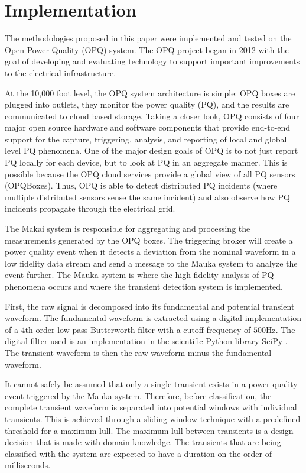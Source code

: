 \documentclass[10pt,conference,compsocconf]{IEEEtran}
\begin{document}
\section{Implementation}
\label{sec:Implementation}
The methodologies proposed in this paper were implemented and tested on the Open Power Quality (OPQ) system. The OPQ project began in 2012 with the goal of developing and evaluating technology to support important improvements to the electrical infrastructure. 

At the 10,000 foot level, the OPQ system architecture is simple: OPQ boxes are plugged into outlets, they monitor the power quality (PQ), and the results are communicated to cloud based storage. Taking a closer look, OPQ consists of four major open source hardware and software components that provide end-to-end support for the capture, triggering, analysis, and reporting of local and global level PQ phenomena. One of the major design goals of OPQ is to not just report PQ locally for each device, but to look at PQ in an aggregate manner. This is possible because the OPQ cloud services provide a global view of all PQ sensors (OPQBoxes). Thus, OPQ is able to detect distributed PQ incidents (where multiple distributed sensors sense the same incident) and also observe how PQ incidents propagate through the electrical grid.

The Makai system is responsible for aggregating and processing the measurements generated by the OPQ boxes. The triggering broker will create a power quality event when it detects a deviation from the nominal waveform in a low fidelity data stream and send a message to the Mauka system to analyze the event further. The Mauka system is where the high fidelity analysis of PQ phenomena occurs and where the transient detection system is implemented.

First, the raw signal is decomposed into its fundamental and potential transient waveform. The fundamental waveform is extracted using a digital implementation of a 4th order low pass Butterworth filter with a cutoff frequency of $500$Hz. The digital filter used is an implementation in the scientific Python library SciPy \cite{scipy:2019}. The transient waveform is then the raw waveform minus the fundamental waveform.

It cannot safely be assumed that only a single transient exists in a power quality event triggered by the Mauka system. Therefore, before classification, the complete transient waveform is separated into potential windows with individual transients. This is achieved through a sliding window technique with a predefined threshold for a maximum lull. The maximum lull between transients is a design decision that is made with domain knowledge. The transients that are being classified with the system are expected to have a duration on the order of milliseconds. 
\end{document}
